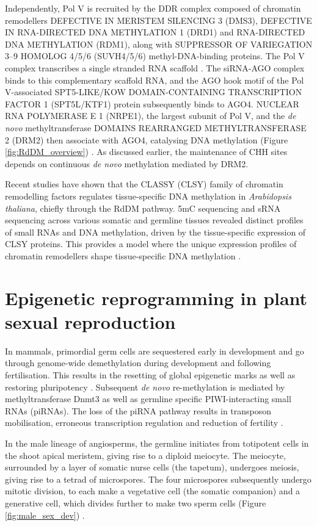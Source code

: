 Independently, Pol V is recruited by the DDR complex composed of chromatin remodellers DEFECTIVE IN MERISTEM SILENCING 3 (DMS3), DEFECTIVE IN RNA-DIRECTED DNA METHYLATION 1 (DRD1) and RNA-DIRECTED DNA METHYLATION (RDM1), along with SUPPRESSOR OF VARIEGATION 3–9 HOMOLOG 4/5/6 (SUVH4/5/6) methyl-DNA-binding proteins. The Pol V complex transcribes a single stranded RNA scaffold \cite{RN33}. The siRNA-AGO complex binds to this complementary scaffold RNA, and the AGO hook motif of the Pol V-associated SPT5-LIKE/KOW DOMAIN-CONTAINING TRANSCRIPTION FACTOR 1 (SPT5L/KTF1) protein subsequently binds to AGO4. NUCLEAR RNA POLYMERASE E 1 (NRPE1), the largest subunit of Pol V, and the \textit{de novo} methyltransferase DOMAINS REARRANGED METHYLTRANSFERASE 2 (DRM2) then associate with AGO4, catalysing DNA methylation (Figure \ref{fig:RdDM_overview})  \cite{RN228,RN121,RN122}. As discussed earlier, the maintenance of CHH sites depends on continuous \textit{de novo} methylation mediated by DRM2.

Recent studies have shown that the CLASSY (CLSY) family of chromatin remodelling factors regulates tissue-specific DNA methylation in \textit{Arabidopsis thaliana}, chiefly through the RdDM pathway. 5mC sequencing and sRNA sequencing across various somatic and germline tissues revealed distinct profiles of small RNAs and DNA methylation, driven by the tissue-specific expression of CLSY proteins. This provides a model where the unique expression profiles of chromatin remodellers shape tissue-specific DNA methylation \cite{RN162}.  


\section{Epigenetic reprogramming in plant sexual reproduction}

In mammals, primordial germ cells are sequestered early in development and go through genome-wide demethylation during development and following fertilisation. This results in the resetting of global epigenetic marks as well as restoring pluripotency \cite{RN210}. Subsequent \textit{de novo} re-methylation is mediated by methyltransferase Dnmt3 as well as germline specific PIWI-interacting small RNAs (piRNAs). The loss of the piRNA pathway results in transposon mobilisation, erroneous transcription regulation and reduction of fertility \cite{RN124,RN125,RN126}.

In the male lineage of angiosperms, the germline initiates from totipotent cells in the shoot apical meristem, giving rise to a diploid meiocyte. The meiocyte, surrounded by a layer of somatic nurse cells (the tapetum), undergoes meiosis, giving rise to a tetrad of microspores. The four microspores subsequently undergo mitotic division, to each make a vegetative cell (the somatic companion) and a generative cell, which divides further to make two sperm cells (Figure \ref{fig:male_sex_dev}) \cite{RN14,RN199}. 

